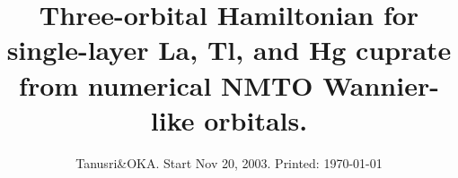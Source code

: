 


\newtheorem{theorem}{Theorem}
\newtheorem{acknowledgement}[theorem]{Acknowledgement}
\newtheorem{algorithm}[theorem]{Algorithm}
\newtheorem{axiom}[theorem]{Axiom}
\newtheorem{claim}[theorem]{Claim}
\newtheorem{conclusion}[theorem]{Conclusion}
\newtheorem{condition}[theorem]{Condition}
\newtheorem{conjecture}[theorem]{Conjecture}
\newtheorem{corollary}[theorem]{Corollary}
\newtheorem{criterion}[theorem]{Criterion}
\newtheorem{definition}[theorem]{Definition}
\newtheorem{example}[theorem]{Example}
\newtheorem{exercise}[theorem]{Exercise}
\newtheorem{lemma}[theorem]{Lemma}
\newtheorem{notation}[theorem]{Notation}
\newtheorem{problem}[theorem]{Problem}
\newtheorem{proposition}[theorem]{Proposition}
\newtheorem{remark}[theorem]{Remark}
\newtheorem{solution}[theorem]{Solution}
\newtheorem{summary}[theorem]{Summary}


\title{Three-orbital Hamiltonian for single-layer La, Tl, and Hg cuprate
from numerical NMTO Wannier-like orbitals.}
\author{Tanusri\&OKA. Start Nov 20, 2003. Printed: \today}
\maketitle

\vspace{1in}

